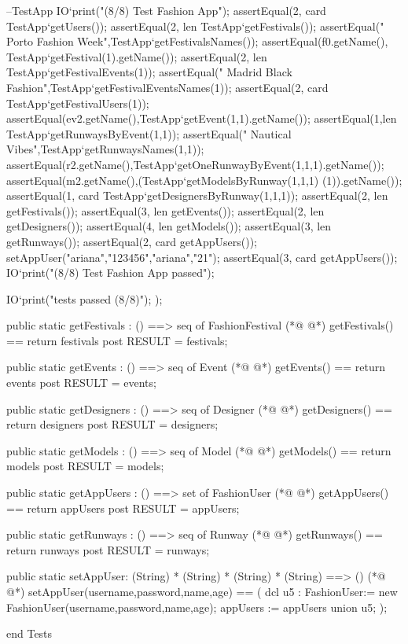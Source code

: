 \begin{vdmpp}[breaklines=true]
     --TestApp
      IO`print("(8/8) Test Fashion App\n");
      assertEqual(2, card TestApp`getUsers());
      assertEqual(2, len TestApp`getFestivals());
      assertEqual(" Porto Fashion Week\n",TestApp`getFestivalsNames());
      assertEqual(f0.getName(), TestApp`getFestival(1).getName());
     assertEqual(2, len TestApp`getFestivalEvents(1));
     assertEqual(" Madrid Black Fashion",TestApp`getFestivalEventsNames(1));
     assertEqual(2, card TestApp`getFestivalUsers(1));
     assertEqual(ev2.getName(),TestApp`getEvent(1,1).getName());
    assertEqual(1,len TestApp`getRunwaysByEvent(1,1));
    assertEqual(" Nautical Vibes",TestApp`getRunwaysNames(1,1));
    assertEqual(r2.getName(),TestApp`getOneRunwayByEvent(1,1,1).getName());
    assertEqual(m2.getName(),(TestApp`getModelsByRunway(1,1,1) (1)).getName());
    assertEqual(1, card TestApp`getDesignersByRunway(1,1,1));
    assertEqual(2, len getFestivals());
    assertEqual(3, len getEvents());
    assertEqual(2, len getDesigners());
    assertEqual(4, len getModels());
    assertEqual(3, len getRunways());
    assertEqual(2, card getAppUsers());
    setAppUser("ariana","123456","ariana","21");
    assertEqual(3, card getAppUsers());
    IO`print("\n(8/8) Test Fashion App passed\n");
    
    IO`print("\nAll tests passed (8/8)\n");
  );
  
  public  static getFestivals : () ==> seq of FashionFestival
(*@
\label{getFestivals:228}
@*)
  getFestivals() == return festivals
  post RESULT = festivals;
  
  public  static getEvents : () ==> seq of Event
(*@
\label{getEvents:232}
@*)
  getEvents() == return events
  post RESULT = events;
  
  public  static getDesigners : () ==> seq of Designer
(*@
\label{getDesigners:236}
@*)
  getDesigners() == return designers
  post RESULT = designers;
   
 public  static getModels : () ==> seq of Model
(*@
\label{getModels:240}
@*)
  getModels() == return models
  post RESULT = models;
    
  public  static getAppUsers : () ==> set of FashionUser
(*@
\label{getAppUsers:244}
@*)
  getAppUsers() == return appUsers
  post RESULT = appUsers;
    
  public  static getRunways : () ==> seq of Runway
(*@
\label{getRunways:248}
@*)
  getRunways() == return runways
  post RESULT = runways;
    
  public static setAppUser: (String) *  (String) * (String) * (String) ==> ()
(*@
\label{setAppUser:252}
@*)
  setAppUser(username,password,name,age) == 
  (
   dcl u5 : FashionUser:= new FashionUser(username,password,name,age);
   appUsers := appUsers union {u5};
   );
   
 
 
end Tests
\end{vdmpp}
